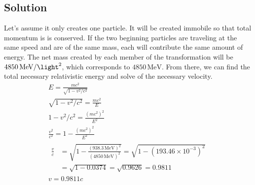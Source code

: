 \documentclass[12pt]{article}
\newcommand{\E}[1]{\times 10^{#1}}
\begin{document}
    \subsection{Solution}
        Let's assume it only creates one particle.
        It will be created immobile so that total momentum is is conserved.
        If the two beginning particles are traveling at the same speed and are of the same mass, each will contribute the same amount of energy.
        The net mass created by each member of the transformation will be $4850\,\unit{\mega\eV/\light^2}$, which corresponds to $4850\,\unit{\mega\eV}$.
        From there, we can find the total necessary relativistic energy and solve of the necessary velocity.
        \begin{gather}
            E = \frac{mc^2}{\sqrt{1 - v^2/c^2}}\\
            \sqrt{1 - v^2/c^2} = \frac{mc^2}{E}\\
            1 - v^2/c^2 = \frac{(mc^2)^2}{E^2}\\
            \frac{v^2}{c^2} = 1 - \frac{(mc^2)^2}{E^2}\\
            \begin{align}
                \frac{v}{c} &=  \sqrt{1 - \frac{(938.3\,\unit{\mega\eV})^2}{(4850\,\unit{\mega\eV})^2}}
                    =   \sqrt{1 - (193.46\E{-3})^2}\\
                    &=  \sqrt{1 - 0.0374}
                    =   \sqrt{0.9626}
                    =   0.9811
            \end{align}\\
            v = \boxed{0.9811c}
        \end{gather}
\end{document}
